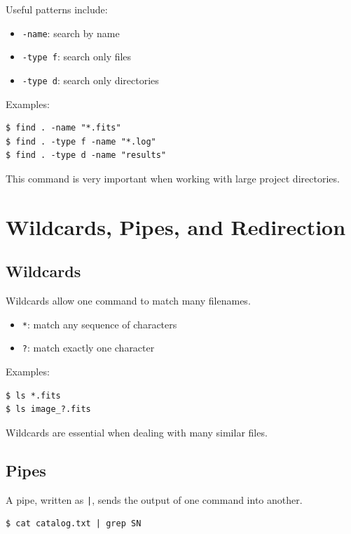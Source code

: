 Useful patterns include:

\begin{itemize}
\item \texttt{-name}: search by name
\item \texttt{-type f}: search only files
\item \texttt{-type d}: search only directories
\end{itemize}

Examples:

\begin{lstlisting}
$ find . -name "*.fits"
$ find . -type f -name "*.log"
$ find . -type d -name "results"
\end{lstlisting}

This command is very important when working with large project directories.

\section{Wildcards, Pipes, and Redirection}

\subsection{Wildcards}

Wildcards allow one command to match many filenames.

\begin{itemize}
\item \texttt{*}: match any sequence of characters
\item \texttt{?}: match exactly one character
\end{itemize}

Examples:

\begin{lstlisting}
$ ls *.fits
$ ls image_?.fits
\end{lstlisting}

Wildcards are essential when dealing with many similar files.

\subsection{Pipes}

A pipe, written as \texttt{|}, sends the output of one command into another.

\begin{lstlisting}
$ cat catalog.txt | grep SN
\end{lstlisting}

